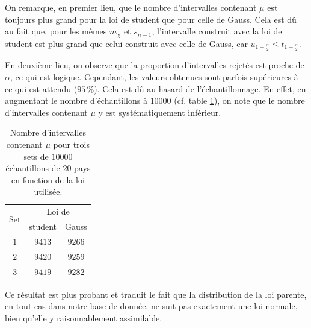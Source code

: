 \documentclass[a4paper, 12pt]{article}
\begin{document}
	On remarque, en premier lieu, que le nombre d'intervalles contenant $\mu$ est toujours plus grand pour la loi de student que pour celle de Gauss. Cela est dû au fait que, pour les mêmes $m_{\chi}$ et $s_{n-1}$, l'intervalle construit avec la loi de student est plus grand que celui construit avec celle de Gauss, car $u_{1 - \frac{\alpha}{2}} \leq t_{1 - \frac{\alpha}{2}}$. \par
	En deuxième lieu, on observe que la proportion d'intervalles rejetés est proche de $\alpha$, ce qui est logique. Cependant, les valeurs obtenues sont parfois supérieures à ce qui est attendu ($\num{95} \,\%$). Cela est dû au hasard de l'échantillonnage. En effet, en augmentant le nombre d'échantillons à $\num{10000}$ (cf. table \ref{table:Q3dbis}), on note que le nombre d'intervalles contenant $\mu$ y est systématiquement inférieur. \par
		\begin{table}[h!]
		\centering
		\begin{tabular}{|c|c|c|}
			\hline
			\multirow{2}{*}{Set} & \multicolumn{2}{c|}{Loi de} \\ \cline{2-3}
			                     &   student    &    Gauss     \\ \hline\hline
			        $1$          & $\num{9413}$ & $\num{9266}$ \\ \hline
			        $2$          & $\num{9420}$ & $\num{9259}$ \\ \hline
			        $3$          & $\num{9419}$ & $\num{9282}$ \\ \hline
		\end{tabular}
		\caption{Nombre d'intervalles contenant $\mu$ pour trois sets de $\num{10000}$ échantillons de $20$ pays en fonction de la loi utilisée.}
		\label{table:Q3dbis}
	\end{table}
	Ce résultat est plus probant et traduit le fait que la distribution de la loi parente, en tout cas dans notre base de donnée, ne suit pas exactement une loi normale, bien qu'elle y raisonnablement assimilable.
\end{document}

